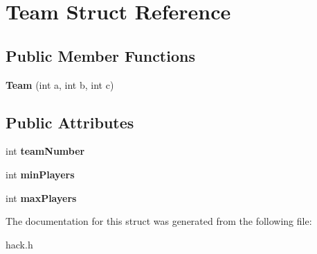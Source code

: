 \hypertarget{struct_team}{\section{Team Struct Reference}
\label{struct_team}
}
\subsection*{Public Member Functions}
\begin{DoxyCompactItemize}
\item 
\hypertarget{struct_team_a74a00fe43ef5a262355d64316f3158cf}{{\bfseries Team} (int a, int b, int c)}\label{struct_team_a74a00fe43ef5a262355d64316f3158cf}

\end{DoxyCompactItemize}
\subsection*{Public Attributes}
\begin{DoxyCompactItemize}
\item 
\hypertarget{struct_team_adcf117f0d57450d201781e7c4daa87ac}{int {\bfseries team\-Number}}\label{struct_team_adcf117f0d57450d201781e7c4daa87ac}

\item 
\hypertarget{struct_team_a8519b685828d68f9700c14e3cac975d4}{int {\bfseries min\-Players}}\label{struct_team_a8519b685828d68f9700c14e3cac975d4}

\item 
\hypertarget{struct_team_a454af8dec5de5d98eee384c02520282a}{int {\bfseries max\-Players}}\label{struct_team_a454af8dec5de5d98eee384c02520282a}

\end{DoxyCompactItemize}


The documentation for this struct was generated from the following file\-:\begin{DoxyCompactItemize}
\item 
hack.\-h\end{DoxyCompactItemize}

